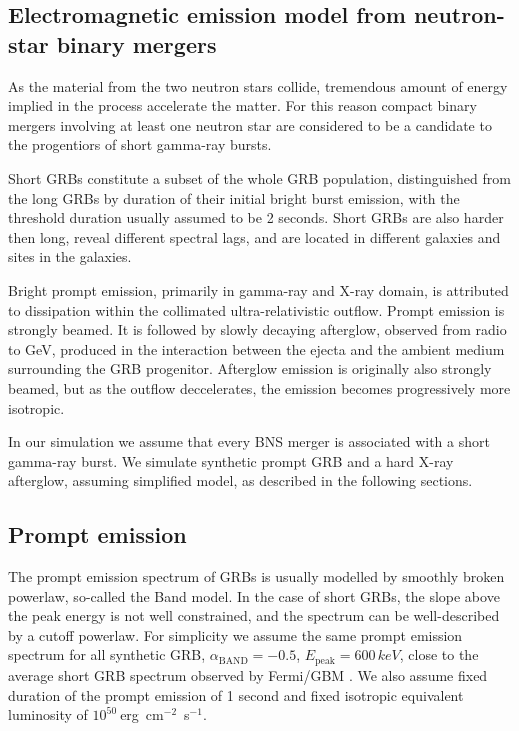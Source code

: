 \documentclass[a0,portrait]{a0poster}
\newcommand{\ECM}[1] {\textbf{\textcolor{magenta}{#1}}}
\begin{document}
\begin{multicols}{2}
\section*{Electromagnetic emission model from neutron-star binary mergers}

As the material from the two neutron stars collide, tremendous amount
of energy implied in the process accelerate the matter. For this
reason compact binary mergers involving at least one neutron star are
considered to be a candidate to the progentiors of short gamma-ray
bursts.

 Short GRBs constitute a subset of the whole GRB population,
 distinguished from the long GRBs by duration of their initial bright
 burst emission, with the threshold duration usually assumed to be 2
 seconds. Short GRBs are also harder then long, reveal different
 spectral lags, and are located in different galaxies and sites in the
 galaxies.

Bright prompt emission, primarily in gamma-ray and X-ray domain, is
attributed to dissipation within the collimated ultra-relativistic
outflow. Prompt emission is strongly beamed. It is followed by slowly
decaying afterglow, observed from radio to GeV, produced in the
interaction between the ejecta and the ambient medium surrounding the
GRB progenitor. Afterglow emission is originally also strongly beamed,
but as the outflow deccelerates, the emission becomes progressively
more isotropic.

In our simulation we assume that every BNS merger is associated with a
short gamma-ray burst. We simulate synthetic prompt GRB and a hard
X-ray afterglow, assuming simplified model, as described in the
following sections.

\subsection*{Prompt emission}


The prompt emission spectrum of GRBs is usually modelled by smoothly
broken powerlaw, so-called the Band \citep{band93} model. In the case
of short GRBs, the slope above the peak energy is not well
constrained, and the spectrum can be well-described by a cutoff
powerlaw. For simplicity we assume the same prompt emission spectrum
for all synthetic GRB, $\alpha_{\mathrm{BAND}} = - 0.5$,
$E_{\mathrm{peak}} = 600 \, keV$, close to the average short GRB
spectrum observed by Fermi/GBM \citep{gruber14}. We also assume fixed
duration of the prompt emission of 1 second and fixed isotropic
equivalent luminosity of $10^{50}~$erg~cm$^{-2}$~s$^{-1}$.


\end{multicols}
\end{document}
